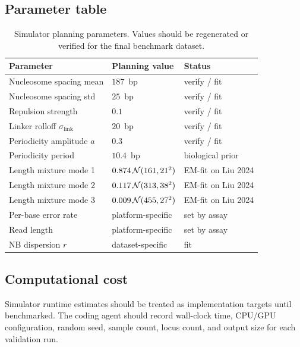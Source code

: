 \subsection*{Parameter table}
\begin{table}[htbp]
\centering\small
\caption{Simulator planning parameters. Values should be regenerated or verified for the final benchmark dataset.}
\label{tab:simparams}
\begin{tabular}{lll}
\toprule
Parameter & Planning value & Status \\
\midrule
Nucleosome spacing mean & $187$~bp & verify / fit \\
Nucleosome spacing std & $25$~bp & verify / fit \\
Repulsion strength & $0.1$ & verify / fit \\
Linker rolloff $\sigma_{\mathrm{link}}$ & $20$~bp & verify / fit \\
Periodicity amplitude $a$ & $0.3$ & verify / fit \\
Periodicity period & $10.4$~bp & biological prior \\
Length mixture mode 1 & $0.874\,\mathcal{N}(161, 21^2)$ & EM-fit on Liu 2024 \\
Length mixture mode 2 & $0.117\,\mathcal{N}(313, 38^2)$ & EM-fit on Liu 2024 \\
Length mixture mode 3 & $0.009\,\mathcal{N}(455, 27^2)$ & EM-fit on Liu 2024 \\
Per-base error rate & platform-specific & set by assay \\
Read length & platform-specific & set by assay \\
NB dispersion $r$ & dataset-specific & fit \\
\bottomrule
\end{tabular}
\end{table}

\subsection*{Computational cost}
Simulator runtime estimates should be treated as implementation targets until benchmarked. The coding agent should record wall-clock time, CPU/GPU configuration, random seed, sample count, locus count, and output size for each validation run.
